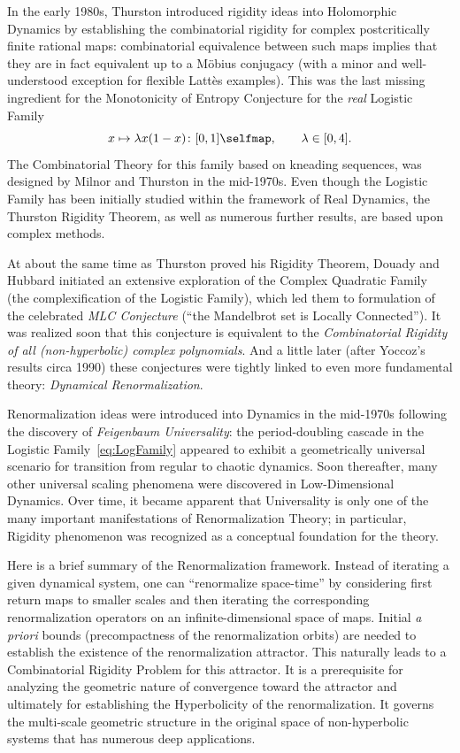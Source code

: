 \documentclass{amsart}
\begin{document}
In the early 1980s, Thurston introduced rigidity ideas into Holomorphic Dynamics by establishing the combinatorial rigidity for complex postcritically finite rational maps: combinatorial equivalence between such maps implies that they are in fact equivalent up to a M\"obius conjugacy (with a minor and well-understood exception for flexible Latt\`es examples). This was the last missing ingredient for the 
Monotonicity of Entropy Conjecture for the \emph{real} Logistic Family 
\begin{equation}
\label{eq:LogFamily}
    x\mapsto \lambda x(1-x) \colon [0,1]\selfmap ,\qquad \lambda\in [0,4].
\end{equation}
The Combinatorial Theory for this family
based on kneading sequences, was designed by Milnor and Thurston in the mid-1970s. Even though the Logistic Family has been initially studied within the framework of Real Dynamics, 
the Thurston Rigidity Theorem, as well as numerous further results, 
are based upon complex methods.

At about the same time as Thurston proved his Rigidity Theorem,   
Douady and Hubbard initiated  an extensive  exploration of the Complex Quadratic Family 
(the complexification of the Logistic Family), 
which led them to formulation of the celebrated {\em MLC Conjecture} 
(``the Mandelbrot set is Locally Connected''). 
It was realized soon that this conjecture is equivalent 
to the {\em Combinatorial Rigidity of all (non-hyperbolic) complex polynomials}.
And a little later (after Yoccoz's results circa 1990)  these conjectures were tightly linked to
even more  fundamental theory: {\em Dynamical Renormalization}. 

Renormalization ideas were introduced into Dynamics in the mid-1970s following the discovery of 
{\em Feigenbaum Universality}: 
the period-doubling cascade in the Logistic Family~\eqref{eq:LogFamily} appeared to 
exhibit a geometrically universal scenario for transition from regular to chaotic dynamics. 
Soon thereafter, many other universal scaling phenomena were discovered in Low-Dimensional Dynamics. Over time, it became apparent that Universality is only one of the many important 
manifestations of Renormalization Theory;
in particular, Rigidity phenomenon was recognized as a conceptual foundation for the theory. 

Here is a brief summary of the Renormalization framework. Instead of iterating a given dynamical system, one can ``renormalize space-time'' by considering first return maps 
to smaller scales and  then iterating 
the corresponding renormalization operators on an infinite-dimensional space of maps. Initial \emph{a priori} bounds (precompactness of the renormalization orbits) 
are needed to establish the existence of the renormalization attractor. 
This naturally leads to 
a Combinatorial Rigidity Problem for this attractor. 
It is a prerequisite for analyzing the geometric nature of convergence toward the attractor and ultimately
for establishing the Hyperbolicity of the renormalization.
It governs the multi-scale geometric structure
in the original space of non-hyperbolic systems
that has numerous deep applications.
\end{document}
